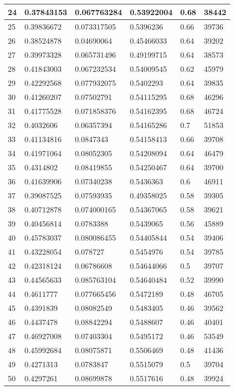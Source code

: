 \begin{longtable}{|l|l|l|l|l|l|}
24 & 0.37843153 & 0.067763284 & 0.53922004 & 0.68 & 38442 \\ \hline 
25 & 0.39836672 & 0.073317505 & 0.5396236 & 0.66 & 39736 \\ \hline 
26 & 0.38524878 & 0.04690064 & 0.45466033 & 0.64 & 39202 \\ \hline 
27 & 0.39973328 & 0.065731496 & 0.49199715 & 0.64 & 38573 \\ \hline 
28 & 0.41843003 & 0.067232534 & 0.54009545 & 0.62 & 45979 \\ \hline 
29 & 0.42292568 & 0.077932075 & 0.5402293 & 0.64 & 39835 \\ \hline 
30 & 0.41260207 & 0.07502791 & 0.54115295 & 0.68 & 46296 \\ \hline 
31 & 0.41775528 & 0.071858376 & 0.54162395 & 0.68 & 46724 \\ \hline 
32 & 0.4032606 & 0.06357394 & 0.54165286 & 0.7 & 51853 \\ \hline 
33 & 0.41134816 & 0.0847343 & 0.54158413 & 0.66 & 39708 \\ \hline 
34 & 0.41971064 & 0.08052305 & 0.54208094 & 0.64 & 46479 \\ \hline 
35 & 0.4314802 & 0.08419855 & 0.54250467 & 0.64 & 39700 \\ \hline 
36 & 0.41639906 & 0.07340238 & 0.5436363 & 0.6 & 46911 \\ \hline 
37 & 0.39087525 & 0.07593935 & 0.49358025 & 0.58 & 39305 \\ \hline 
38 & 0.40712878 & 0.074000165 & 0.54367065 & 0.58 & 39621 \\ \hline 
39 & 0.40456814 & 0.0783388 & 0.5439065 & 0.56 & 45889 \\ \hline 
40 & 0.45783037 & 0.080086455 & 0.54405844 & 0.54 & 39406 \\ \hline 
41 & 0.43228054 & 0.078727 & 0.5454976 & 0.54 & 39785 \\ \hline 
42 & 0.42318124 & 0.06786608 & 0.54644066 & 0.5 & 39707 \\ \hline 
43 & 0.44565633 & 0.085763104 & 0.54640484 & 0.52 & 39990 \\ \hline 
44 & 0.4611777 & 0.077665456 & 0.5472189 & 0.48 & 46705 \\ \hline 
45 & 0.4391839 & 0.08082549 & 0.5483405 & 0.46 & 39562 \\ \hline 
46 & 0.4437478 & 0.08842294 & 0.5488607 & 0.46 & 40401 \\ \hline 
47 & 0.46927008 & 0.07403304 & 0.5495172 & 0.46 & 53549 \\ \hline 
48 & 0.45992684 & 0.08075871 & 0.5506469 & 0.48 & 41436 \\ \hline 
49 & 0.4271313 & 0.0783847 & 0.5515079 & 0.5 & 39704 \\ \hline 
50 & 0.4297261 & 0.08699878 & 0.5517616 & 0.48 & 39924 \\ \hline 
\end{longtable}